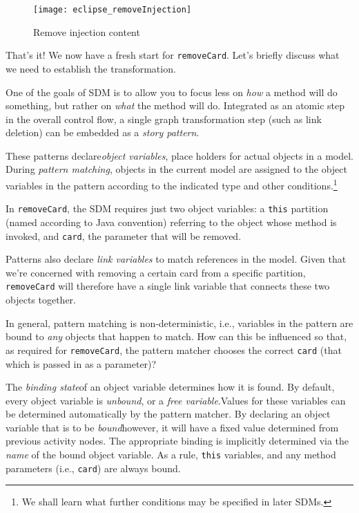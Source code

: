 \newpage

\begin{figure}[htbp]
	\centering
    \texttt{[image: eclipse\_removeInjection]}
	\caption{Remove injection content}
	\label{fig:delete_injection}
\end{figure}

\vspace{1cm}

That's it! We now have a fresh start for \texttt{removeCard}. Let's briefly discuss what we need to establish the transformation.

One of the goals of SDM is to allow you to focus less on \emph{how} a method will do something, but rather on \emph{what} the method will do.
Integrated as an atomic step in the overall control flow, a single graph transformation step (such as link deletion) can be embedded as a
\emph{story pattern}.

These patterns declare\emph{object variables}, place holders for actual objects in a model. During \emph{pattern matching}, objects
in the current model are assigned to the object variables in the pattern according to the indicated type and other conditions.\footnote{We shall learn what
further conditions may be specified in later SDMs.}

\clearpage

In \texttt{removeCard}, the SDM requires just two object variables: a \texttt{this} partition (named according to Java convention) referring to the
object whose method is invoked, and \texttt{card}, the parameter that will be removed.

Patterns also declare \emph{link variables} to match references in the model. Given that
we're concerned with removing a certain card from a specific partition, \texttt{removeCard} will therefore have a single link variable that connects these two
objects together.

In general, pattern matching is non-deterministic, i.e., variables in the pattern are bound to \emph{any} objects that happen to match. How can this
be influenced so that, as required for \texttt{removeCard}, the pattern matcher chooses the correct \texttt{card} (that which is passed in as a parameter)?

The \emph{binding state}of an object variable determines how it is found. By default, every object variable is \emph{unbound}, or a 
\emph{free variable}.Values for these variables can be determined automatically by the pattern matcher. By declaring an
object variable that is to be \emph{bound}however, it will have a fixed value determined from previous activity nodes. The appropriate binding is
implicitly determined via the \emph{name} of the bound object variable. As a rule, \texttt{this} variables, and any method parameters (i.e., \texttt{card}) are
always bound.

